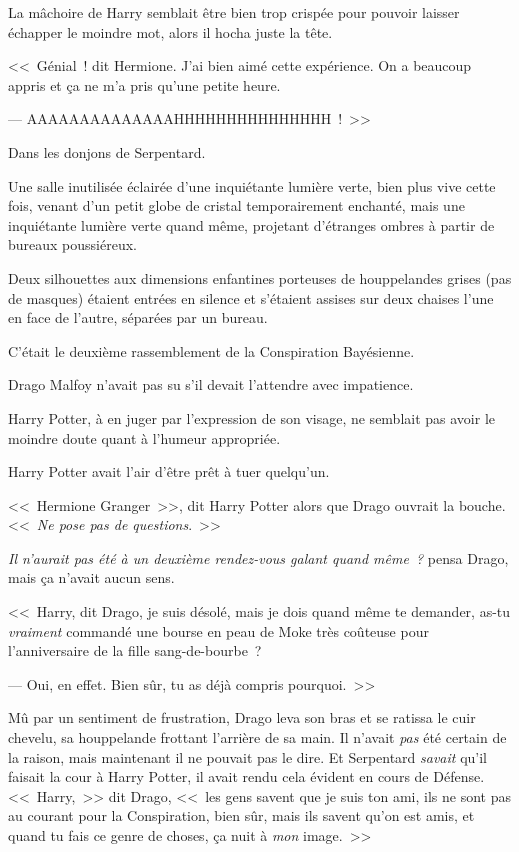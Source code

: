 La mâchoire de Harry semblait être bien trop crispée pour pouvoir laisser échapper le moindre mot, alors il hocha juste la tête.

<<~Génial~! dit Hermione. J'ai bien aimé cette expérience. On a beaucoup appris et ça ne m'a pris qu'une petite heure.

--- AAAAAAAAAAAAAAHHHHHHHHHHHHHHH~!~>>

\later

Dans les donjons de Serpentard.

Une salle inutilisée éclairée d'une inquiétante lumière verte, bien plus vive cette fois, venant d'un petit globe de cristal temporairement enchanté, mais une inquiétante lumière verte quand même, projetant d'étranges ombres à partir de bureaux poussiéreux.

Deux silhouettes aux dimensions enfantines porteuses de houppelandes grises (pas de masques) étaient entrées en silence et s'étaient assises sur deux chaises l'une en face de l'autre, séparées par un bureau.

C'était le deuxième rassemblement de la Conspiration Bayésienne.

Drago Malfoy n'avait pas su s'il devait l'attendre avec impatience.

Harry Potter, à en juger par l'expression de son visage, ne semblait pas avoir le moindre doute quant à l'humeur appropriée.

Harry Potter avait l'air d'être prêt à tuer quelqu'un.

<<~Hermione Granger~>>, dit Harry Potter alors que Drago ouvrait la bouche. <<~\emph{Ne pose pas de questions}.~>>

\emph{Il n'aurait pas été à un deuxième rendez-vous galant quand même~?} pensa Drago, mais ça n'avait aucun sens.

<<~Harry, dit Drago, je suis désolé, mais je dois quand même te demander, as-tu \emph{vraiment} commandé une bourse en peau de Moke très coûteuse pour l'anniversaire de la fille sang-de-bourbe~?

--- Oui, en effet. Bien sûr, tu as déjà compris pourquoi.~>>

Mû par un sentiment de frustration, Drago leva son bras et se ratissa le cuir chevelu, sa houppelande frottant l'arrière de sa main. Il n'avait \emph{pas} été certain de la raison, mais maintenant il ne pouvait pas le dire. Et Serpentard \emph{savait} qu'il faisait la cour à Harry Potter, il avait rendu cela évident en cours de Défense. <<~Harry,~>> dit Drago, <<~les gens savent que je suis ton ami, ils ne sont pas au courant pour la Conspiration, bien sûr, mais ils savent qu'on est amis, et quand tu fais ce genre de choses, ça nuit à \emph{mon} image.~>>

